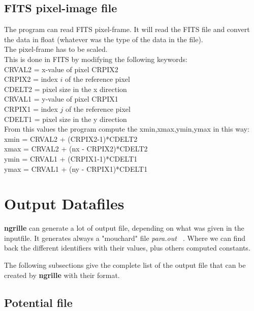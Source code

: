 \subsection{FITS pixel-image file}

The program can read FITS pixel-frame. It will read the FITS file and
convert the data in float (whatever was the type of the data in the file).\\

The pixel-frame has to be scaled.\\

This is done in FITS by modifying the following keywords:\\
CRVAL2 = x-value of pixel CRPIX2\\
CRPIX2 = index  $i$ of the reference pixel\\
CDELT2 = pixel size in the x direction\\
CRVAL1 = y-value of pixel CRPIX1\\
CRPIX1 = index  $j$ of the reference pixel\\
CDELT1 = pixel size in the y direction\\

From this values the program compute the xmin,xmax,ymin,ymax in this way:\\

xmin = CRVAL2 + (CRPIX2-1)*CDELT2\\
xmax = CRVAL2 + (nx - CRPIX2)*CDELT2\\
ymin = CRVAL1 + (CRPIX1-1)*CDELT1\\
ymax = CRVAL1 + (ny - CRPIX1)*CDELT1\\



\section{Output Datafiles}

{\bf ngrille} can generate a lot of output file, depending on what
was given in the inputfile. It generates always a "mouchard" file
{\sl para.out \ }. Where we can find back the different identifiers with their
values, plus others computed constants.

The following subsections give the complete list of the output file that
can be created by {\bf ngrille} with their format.


\subsection{Potential file}

